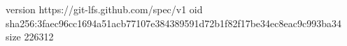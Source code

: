version https://git-lfs.github.com/spec/v1
oid sha256:3faec96cc1694a51acb77107e384389591d72b1f82f17be34ec8eac9c993ba34
size 226312

